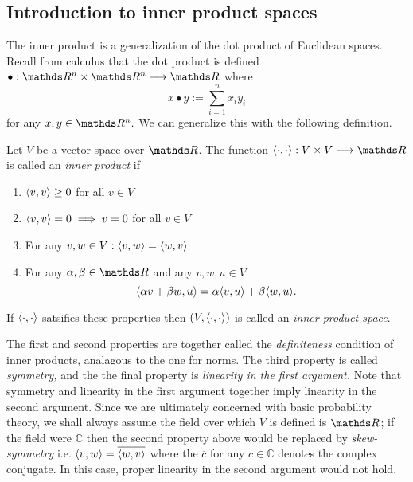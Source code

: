 \subsection{Introduction to inner product spaces}

The inner product is a generalization of the dot product of Euclidean
spaces. Recall from calculus that the dot product is defined $\bullet:\R^{n}\times\R^{n}\longrightarrow\R$
where
\[
x\bullet y:=\sum_{i=1}^{n}x_{i}y_{i}
\]
for any $x,y\in\R^{n}.$ We can generalize this with the following
definition.
\begin{defn}
\label{def:innerProduct}Let $V$ be a vector space over $\R$. The
function $\innerproduct{\cdot}{\cdot}:V\times V\longrightarrow\R$
is called an\emph{ inner product }if

\begin{enumerate}[label=(\roman*),leftmargin=.1\linewidth,rightmargin=.4\linewidth]
	\item $\langle v,v\rangle \geq 0$ for all $ v \in V $
	\item $\langle v,v\rangle =0 \implies v = 0$ for all $ v \in V $
	\item For any $v,w \in V: \langle v,w\rangle = \langle w,v\rangle$
	\item For any $\alpha,\beta \in \R$ and any $v,w,u \in V$
	\[
			\langle\alpha v + \beta w,u\rangle = \alpha\langle v,u\rangle + \beta\langle w,u\rangle.
	\]
\end{enumerate}

If $\langle\cdot,\cdot\rangle$ satsifies these properties then
$\left(V,\langle\cdot,\cdot\rangle\right)$ is called an \emph{inner
product space}.
\end{defn}

The first and second properties are together called the \emph{definiteness
}condition of inner products, analagous to the one for norms. The
third property is called \emph{symmetry, }and the the final property
is \emph{linearity in the first argument.} Note that symmetry and
linearity in the first argument together imply linearity in the second
argument. Since we are ultimately concerned with basic probability
theory, we shall always assume the field over which $V$ is defined
is $\R$; if the field were $\mathds{C}$ then the second property
above would be replaced by \emph{skew-symmetry }i.e. $\langle v,w\rangle=\overline{\langle w,v\rangle}$
where the $\overline{c}$ for any $c\in\mathds{C}$ denotes the complex
conjugate. In this case, proper linearity in the second argument would
not hold.

